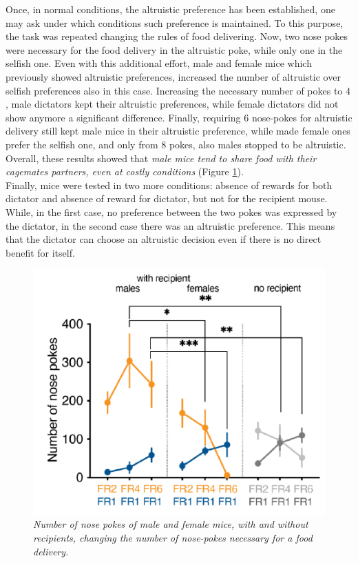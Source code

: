 \documentclass[12pt, a4paper]{report}
\begin{document}
Once, in normal conditions, the altruistic preference has been established, one may ask under which conditions such preference is maintained. To this purpose, the task was repeated changing the rules of food delivering. Now, two nose pokes were necessary for the food delivery in the altruistic poke, while only one in the selfish one. Even with this additional effort, male and female mice which previously showed altruistic preferences, increased the number of altruistic over selfish preferences also in this case. Increasing the necessary number of pokes to $4$, male dictators kept their altruistic preferences, while female dictators did not show anymore a significant difference. Finally, requiring $6$ nose-pokes for altruistic delivery still kept male mice in their altruistic preference, while made female ones prefer the selfish one, and only from $8$ pokes, also males stopped to be altruistic. Overall, these results showed that \textit{male mice tend to share food with their cagemates partners, even at costly conditions} (Figure \ref{number_pokes}).\\
Finally, mice were tested in two more conditions: absence of rewards for both dictator and absence of reward for dictator, but not for the recipient mouse. While, in the first case, no preference between the two pokes was expressed by the dictator, in the second case there was an altruistic preference. This means that the dictator can choose an altruistic decision even if there is no direct benefit for itself.


\begin{figure}[H]
	\begin{center}
		\includegraphics[scale=0.75]{number_pokes.png} 
	\end{center} 
	\caption{\textit{Number of nose pokes of male and female mice, with and without recipients, changing the number of nose-pokes necessary for a food delivery.}} \label{number_pokes}
	
\end{figure}
\end{document}
